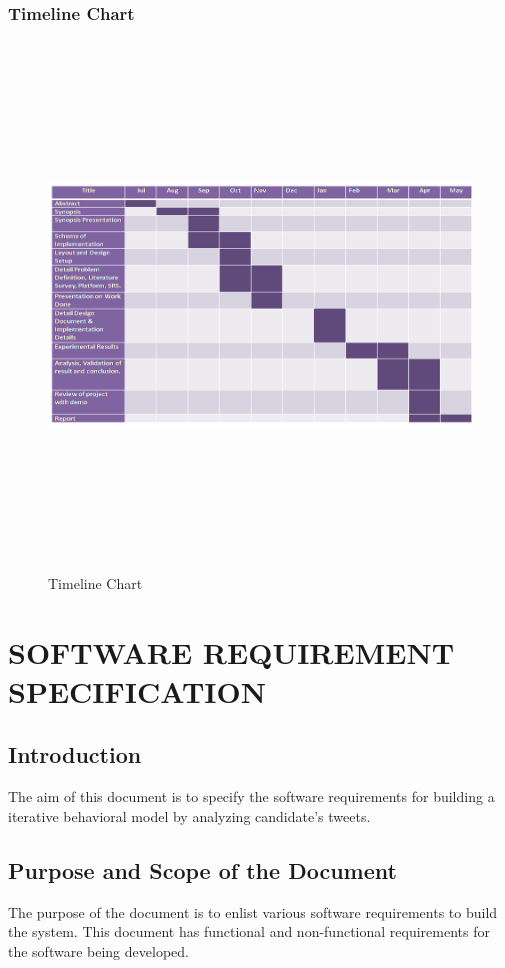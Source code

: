 \documentclass[oneside,a4paper,12pt]{pictreport}
\begin{document}
\subsection{Timeline Chart}
\begin{figure}[!h]
\centering
\includegraphics[width=5.5in,height=5.5in]{timeline.png}
\caption{Timeline Chart}
\end{figure}

\chapter{SOFTWARE REQUIREMENT SPECIFICATION}

\section{Introduction}
The aim of this document is to specify the software requirements for building a iterative behavioral model by analyzing candidate's tweets. 

\section{Purpose and Scope of the Document}
The purpose of the document is to enlist various software requirements to build the system. This document has functional and non-functional requirements for the software being developed.
\end{document}
